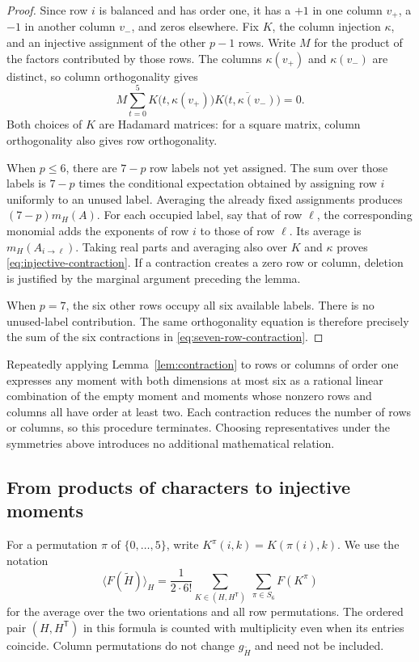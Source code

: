 \begin{proof}
Since row $i$ is balanced and has order one, it has a $+1$ in one column
$v_+$, a $-1$ in another column $v_-$, and zeros elsewhere.  Fix $K$, the
column injection $\kappa$, and an injective assignment of the other
$p-1$ rows.  Write $M$ for the product of the factors contributed by
those rows.  The columns $\kappa(v_+)$ and $\kappa(v_-)$ are distinct,
so column orthogonality gives
\begin{equation*}
  M\sum_{t=0}^{5}
     K\bigl(t,\kappa(v_+)\bigr)
     \overline{K\bigl(t,\kappa(v_-)\bigr)}=0.
\end{equation*}
Both choices of $K$ are Hadamard matrices: for a square matrix, column
orthogonality also gives row orthogonality.

When $p\leq6$, there are $7-p$ row labels not yet assigned.  The sum over
those labels is $7-p$ times the conditional expectation obtained by
assigning row $i$ uniformly to an unused label.  Averaging the already
fixed assignments produces $(7-p)m_H(A)$.  For each occupied label,
say that of row $\ell$, the corresponding monomial adds the exponents
of row $i$ to those of row $\ell$.  Its average is
$m_H(A_{i\to\ell})$.  Taking real parts and averaging also over $K$
and $\kappa$ proves \eqref{eq:injective-contraction}.  If a contraction
creates a zero row or column, deletion is justified by the marginal
argument preceding the lemma.

When $p=7$, the six other rows occupy all six available labels.  There
is no unused-label contribution.  The same orthogonality equation is
therefore precisely the sum of the six contractions in
\eqref{eq:seven-row-contraction}.
\end{proof}

Repeatedly applying Lemma~\ref{lem:contraction} to rows or columns of
order one expresses any moment with both dimensions at most six as a
rational linear combination of the empty moment and moments whose
nonzero rows and columns all have order at least two.  Each contraction
reduces the number of rows or columns, so this procedure terminates.
Choosing representatives under the symmetries above introduces no
additional mathematical relation.

\subsection{From products of characters to injective moments}

For a permutation $\pi$ of $\{0,\ldots,5\}$, write
$K^\pi(i,k)=K(\pi(i),k)$.  We use the notation
\begin{equation}
  \bigl\langle F(\widetilde H)\bigr\rangle_H
   =\frac{1}{2\cdot6!}
     \sum_{K\in(H,H^{\mathsf T})}\ \sum_{\pi\in S_6} F(K^\pi)
  \label{eq:pair-average}
\end{equation}
for the average over the two orientations and all row permutations.
The ordered pair $(H,H^{\mathsf T})$ in this formula is counted with
multiplicity even when its entries coincide.  Column permutations do
not change $g_{\widetilde H}$ and need not be included.

